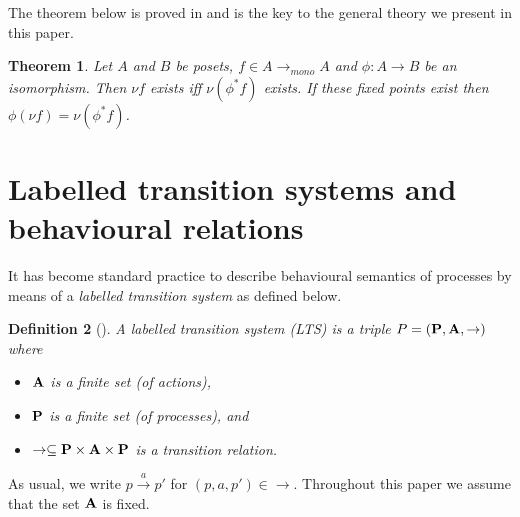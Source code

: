 \documentclass[submission]{eptcs}
\newcommand{\der}[1]{\ensuremath{\stackrel{#1}{\longrightarrow}}}
\newcommand{\sder}[1]{\ensuremath{\stackrel{#1}{\rightarrow}}}
\newcommand{\fun}{\rightarrow}
\newcommand{\ol}[1]{\overline{ #1}}
\newcommand{\Act}{{\bf A}}
\newcommand{\Proc}{{\bf P}}
\newcommand{\Psys}{P}
\newtheorem{theorem}{Theorem}[section]
\newtheorem{corollary}[theorem]{Corollary}
\newtheorem{definition}[theorem]{Definition}
\begin{document}
The theorem below is proved in \cite{AILS2011} and is the key to the
general theory we present in this paper.
\begin{theorem} \label{thm:isomorph}Let $A$ and $B$ be posets, $f\in
  A\fun_{mono} A$ and $\phi: A\fun B$ be an isomorphism. Then $\nu f$
  exists iff $\nu (\phi^*f)$ exists. If these fixed points exist then
  $\phi(\nu f)= \nu(\phi^*f)$.  
\iffalse
\item If $f,g\in A\fun A$ then
  $\phi(f(\alpha g))=(\phi^*f)(\alpha(\phi^*g))$.

\item  $\phi^*: (A\fun A)\fun(B\fun B)$ is an isomorphism.
\item If $g\in A^{k+n}\fun A^k$ then $\alpha\ol{y}.g(\ol{x},\ol{y})$
  is well-defined for fixed $\ol{x}$ and $f:\ol{x}\mapsto
  \alpha\ol{y}.g(\ol{x},\ol{y})$ is in $A^k\fun A^k$ for $k,m\geq 1$
  and $\alpha\in\{\mu,\nu\}$.
\item If  $A$ and $B$ are posets, $f:A\times A\fun B$ and $a\in A$, then 
$\phi^*(f_a):B\fun B$ and $\phi^*(f_a)=\phi^*(f)_{\phi(a)}$.\fi
\end{theorem}
\iffalse
\begin{corollary}
  If $g\in A^{k+n}\fun A^k$ and $h:A^k\fun A^k$ then 
  $\phi(\alpha\ol{y}.g(\beta.h,\ol{y}))=\alpha \ol{z}.\phi^*g(\beta.\phi^*h,\ol{z})$.
\end{corollary}
\fi
\section{Labelled transition systems and behavioural relations}\label{sec:LTS}
It has become standard practice to describe behavioural semantics of
processes by means of a \emph{labelled transition system} as defined
below.  
 \begin{definition}[\cite{Ke76}]
   A \emph{labelled transition system (LTS)} is a triple
   $\Psys =(\Proc,\Act, \sder{})$ where
   \begin{itemize}
   \item $\Act$ is a finite set (of actions),
  \item $\Proc$ is a finite set (of processes), and
  \item $\sder{}\subseteq \Proc\times\Act\times\Proc$ is a transition relation.
  \end{itemize}
\end{definition}
As usual, we write $p\der{a}p'$ for $(p,a,p')\in \sder{}$. Throughout
this paper we assume that the set $\Act$ is fixed.
\end{document}
